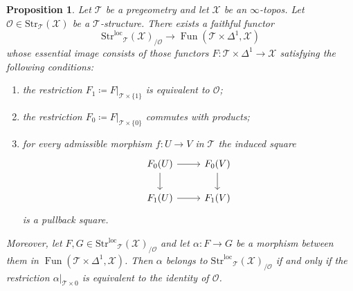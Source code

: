 \documentclass[12pt,a4paper,reqno]{amsart}
\theoremstyle{plain}
\newtheorem{prop}[thm]{Proposition}
\theoremstyle{definition}
\theoremstyle{remark}
\numberwithin{equation}{section}
\begin{document}
\begin{prop} \label{prop:simplifying_strloc}
	Let ${\mathcal T}$ be a pregeometry and let ${\mathcal X}$ be an $\infty$-topos.
	Let ${\mathcal O} \in {\mathrm{Str}}_{\mathcal T}({\mathcal X})$ be a ${\mathcal T}$-structure.
	There exists a faithful functor
	\begin{equation} \label{eq:strloc_arrows}
	{\mathrm{Str}^\mathrm{loc}}_{\mathcal T}({\mathcal X})_{/ {\mathcal O}} \to \operatorname{Fun}({\mathcal T} \times \Delta^1, {\mathcal X})
	\end{equation}
	whose essential image consists of those functors $F \colon {\mathcal T} \times \Delta^1 \to {\mathcal X}$ satisfying the following conditions:
	\begin{enumerate}
		\item the restriction $F_1 \coloneqq F |_{{\mathcal T} \times \{1\}}$ is equivalent to ${\mathcal O}$;
		\item the restriction $F_0 \coloneqq F |_{{\mathcal T} \times \{0\}}$ commutes with products;
		\item for every admissible morphism $f \colon U \to V$ in ${\mathcal T}$ the induced square
		\[ \begin{tikzcd}
		F_0(U) \arrow{r} \arrow{d} & F_0(V) \arrow{d} \\
		F_1(U) \arrow{r} & F_1(V)
		\end{tikzcd} \]
		is a pullback square.
	\end{enumerate}
	Moreover, let $F, G \in {\mathrm{Str}^\mathrm{loc}}_{\mathcal T}({\mathcal X})_{/{\mathcal O}}$ and let $\alpha \colon F \to G$ be a morphism between them in $\operatorname{Fun}({\mathcal T} \times \Delta^1, {\mathcal X})$.
	Then $\alpha$ belongs to ${\mathrm{Str}^\mathrm{loc}}_{\mathcal T}({\mathcal X})_{/{\mathcal O}}$ if and only if the restriction $\alpha |_{{\mathcal T} \times {0}}$ is equivalent to the identity of ${\mathcal O}$.
\end{prop}
\end{document}

